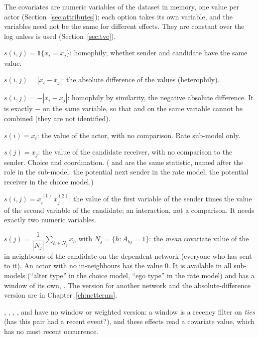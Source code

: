 The covariates are numeric variables of the dataset in memory, one value per actor (Section~\ref{sec:attributes}); each option takes its own variable, and the variables need not be the same for different effects. They are constant over the log unless  is used (Section~\ref{sec:tvc}).
\begin{description}[style=nextline,nosep]
  \item[\opt{same(var)}] $s(i,j)=\mathbb{1}\{x_i=x_j\}$: homophily; whether sender and candidate have the same value.
  \item[\opt{diff(var)}] $s(i,j)=|x_i-x_j|$: the absolute difference of the values (heterophily).
  \item[\opt{sim(var)}] $s(i,j)=-|x_i-x_j|$: homophily by similarity, the negative absolute difference. It is exactly $-$ on the same variable, so that  and  on the same variable cannot be combined (they are not identified).
  \item[\opt{ego(var)}] $s(i)=x_i$: the value of the actor, with no comparison. Rate sub-model only.
  \item[\opt{alter(var)}] $s(j)=x_j$: the value of the candidate receiver, with no comparison to the sender. Choice and coordination. ( and  are the same statistic, named after the role in the sub-model: the potential next sender in the rate model, the potential receiver in the choice model.)
  \item[\opt{egoalterint(v1 v2)}] $s(i,j)=x^{(1)}_i\,x^{(2)}_j$: the value of the first variable of the sender times the value of the second variable of the candidate; an interaction, not a comparison. It needs exactly two numeric variables.
  \item[\opt{tertius(var)}] $s(j)=\dfrac{1}{|N_j|}\sum_{h\in N_j}x_h$ with $N_j=\{h:A_{hj}=1\}$: the \emph{mean} covariate value of the in-neighbours of the candidate on the dependent network (everyone who has sent to it). An actor with no in-neighbours has the value 0. It is available in all sub-models (``alter type'' in the choice model, ``ego type'' in the rate model) and has a window of its own, . The version for another network and the absolute-difference version are in Chapter~\ref{ch:netterms}.
\end{description}
, , , ,  and  have no window or weighted version: a window is a recency filter on \emph{ties} (has this pair had a recent event?), and these effects read a covariate value, which has no most recent occurrence.

